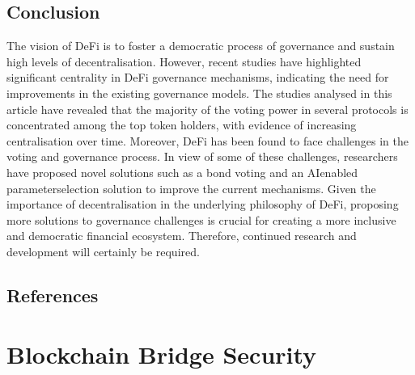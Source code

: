 \documentclass[letterpaper,10pt,english]{jupyterBook}
\begin{document}
\subsection{Conclusion}
\label{\detokenize{GOV/gov:conclusion}}
\sphinxAtStartPar
The vision of DeFi is to foster a democratic process of governance and sustain high levels of decentralisation. However, recent studies have highlighted significant centrality in DeFi governance mechanisms, indicating the need for improvements in the existing governance models. The studies analysed in this article have revealed that the majority of the voting power in several protocols is concentrated among the top token holders, with evidence of increasing centralisation over time. Moreover, DeFi has been found to face challenges in the voting and governance process. In view of some of these challenges, researchers have proposed novel solutions such as a bond voting and an AI\sphinxhyphen{}enabled parameter\sphinxhyphen{}selection solution to improve the current mechanisms. Given the importance of decentralisation in the underlying philosophy of DeFi, proposing more solutions to governance challenges is crucial for creating a more inclusive and democratic financial ecosystem. Therefore, continued research and development will certainly be required.




\subsection{References}
\label{\detokenize{GOV/gov:references}}
\sphinxstepscope


\section{Blockchain Bridge Security}
\label{\detokenize{BBSecurity/bbsecurity:blockchain-bridge-security}}\label{\detokenize{BBSecurity/bbsecurity::doc}}


\sphinxAtStartPar
{}
\end{document}
